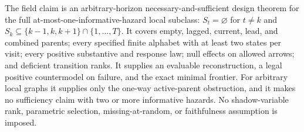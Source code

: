 \documentclass{article}
\begin{document}
The field claim is an arbitrary-horizon necessary-and-sufficient design theorem for the full at-most-one-informative-hazard local subclass: \(S_t=\varnothing\) for \(t\ne k\) and \(S_k\subseteq\{k-1,k,k+1\}\cap\{1,\ldots,T\}\). It covers empty, lagged, current, lead, and combined parents; every specified finite alphabet with at least two states per visit; every positive substantive and response law; null effects on allowed arrows; and deficient transition ranks. It supplies an evaluable reconstruction, a legal positive countermodel on failure, and the exact minimal frontier. For arbitrary local graphs it supplies only the one-way active-parent obstruction, and it makes no sufficiency claim with two or more informative hazards. No shadow-variable rank, parametric selection, missing-at-random, or faithfulness assumption is imposed.
\end{document}
